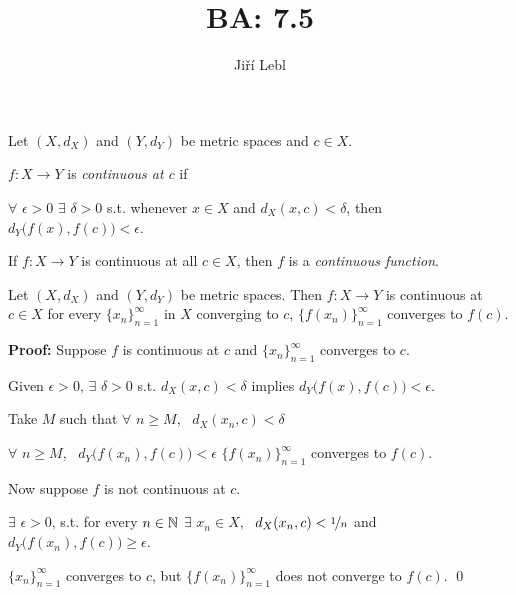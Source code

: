 \documentclass[10pt,aspectratio=149]{beamer}
\author{Ji\v{r}\'i Lebl}
\institute[OSU]{%
Departemento pri Matematiko de Oklahoma {\^S}tata Universitato}
\title{BA: 7.5}
\date{}
\begin{document}
\begin{frame}
\titlepage
\end{frame}

\begin{frame}
\begin{definition}
Let $(X,d_X)$ and $(Y,d_Y)$ be metric spaces and $c \in X$.

\pause
$f \colon X \to Y$ is
\emph{continuous at $c$} if

\pause
$\forall$ $\epsilon > 0$
$\exists$ $\delta > 0$ s.t. whenever $x \in X$ and $d_X(x,c) < \delta$, then
$d_Y\bigl(f(x),f(c)\bigr) < \epsilon$.

\pause
\medskip

If $f \colon X \to Y$ is continuous at all $c \in X$, then
$f$ is a \emph{continuous function}.
\end{definition}

\pause
\begin{proposition}
Let $(X,d_X)$ and $(Y,d_Y)$ be metric spaces.
\pause
Then $f \colon X \to Y$ is
continuous at $c \in X$
\pause
\wiffif for every $\{ x_n \}_{n=1}^\infty$ in $X$
converging to $c$, $\bigl\{ f(x_n) \bigr\}_{n=1}^\infty$ converges
to $f(c)$.
\end{proposition}

\pause
\textbf{Proof:}
Suppose $f$ is continuous at $c$ and $\{ x_n \}_{n=1}^\infty$ converges to
$c$.

\pause
Given $\epsilon > 0$, $\exists$ $\delta > 0$ s.t. $d_X(x,c) < \delta$ implies
$d_Y\bigl(f(x),f(c)\bigr) < \epsilon$.

\pause
Take $M$ such that 
$\forall$ $n \geq M$, ~$d_X(x_n,c) < \delta$

\pause
\thus \quad $\forall$ $n \geq M$, ~$d_Y\bigl(f(x_n),f(c)\bigr) < \epsilon$
\pause
\wthus $\bigl\{ f(x_n) \bigr\}_{n=1}^\infty$
converges to $f(c)$.

\pause
\medskip

Now suppose $f$ is not continuous at $c$.

\pause
$\exists$ $\epsilon > 0$, s.t. for every $n \in {\mathbb{N}}$ $\exists$ $x_n \in X$,
~$d_X(x_n,c) < \nicefrac{1}{n}$ and $d_Y\bigl(f(x_n),f(c)\bigr) \geq \epsilon$.

\pause
\thus \quad $\{ x_n \}_{n=1}^\infty$ converges to $c$, but
$\bigl\{ f(x_n) \bigr\}_{n=1}^\infty$
does not converge to $f(c)$.
\qed

\end{frame}
\end{document}

